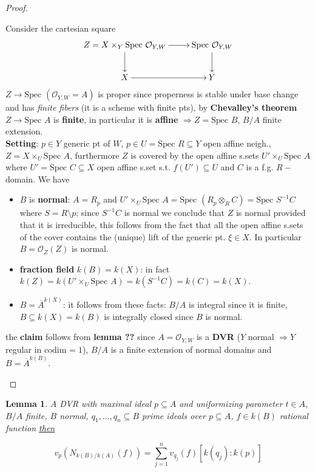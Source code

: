 \documentclass[oneside,a4paper,11pt]{amsbook}
\theoremstyle{pl}
\newtheorem*{lem*}{Lemma}
\theoremstyle{df}
\theoremstyle{rm}
\newcommand{\pa}[1]{
\left(#1\right)
}
\newcommand{\ol}[1]{
\overline{#1}
}
\newcommand{\ul}[1]{
\underline{#1}
}
\newcommand{\mc}[1]{
\mathcal{#1}
}
\newcommand{\spc}[1]{
\text{Spec }#1
}
\newcommand{\cod}[2]{
\text{codim}_{#1}{#2}
}
\begin{document}
\begin{proof}
\begin{itemize}
{\[\]
Consider the cartesian square
\[
\xymatrix{
Z=X\times_Y\spc \mc{O}_{Y,W}\ar[r]\ar[d] &\spc \mc{O}_{Y,W}\ar[d]\\
X\ar[r] &Y\\
}
\]
$Z\rightarrow\spc\pa{\mc{O}_{Y,W}=A}$ is proper since properness is stable under base change and has \emph{finite fibers} (it is a scheme with finite pts), by \textbf{Chevalley's theorem} $Z\rightarrow\spc A$ is \textbf{finite}, in particular it is \textbf{affine} $\Rightarrow Z=\spc B$, $B/A$ finite extension.\\
\textbf{Setting}: $p\in Y$ generic pt of $W$, $p\in U=\spc R\subseteq Y$ open affine neigh., $Z=X\times_U\spc A$, furthermore $Z$ is covered by the open affine s.sets $U'\times_U\spc A$ where $U'=\spc C\subseteq X$ open affine s.set s.t. $f(U')\subseteq U$ and $C$ is a f.g. $R-$domain. We have
\begin{itemize}
\item{$B$ is \textbf{normal}: $A=R_p$ and $U'\times_U\spc A=\spc\pa{R_p\otimes_RC}=\spc S^{-1}C$ where $S=R\setminus p$; since $S^{-1}C$ is normal we conclude that $Z$ is normal provided that it is irreducible, this follows from the fact that all the open affine s.sets of the cover contains the (unique) lift of the generic pt. $\xi\in X$. In particular $B=\mc{O}_Z(Z)$ is normal.}
\item{\textbf{fraction field} $k(B)=k(X)$: in fact $k(Z)=k(U'\times_U\spc A)=k(S^{-1}C)=k(C)=k(X)$.}
\item{$B=\ol{A}^{k(X)}$: it follows from these facts: $B/A$ is integral since it is finite, $B\subseteq k(X)=k(B)$ is integrally closed since $B$ is normal.}
\end{itemize}
the \textbf{claim} follows from \textbf{lemma ??} since $A=\mc{O}_{Y,W}$ is a \textbf{DVR} ($Y$ normal $\Rightarrow Y$ regular in $\cod{}{}=1$), $B/A$ is a finite extension of normal domains and $B=\ol{A}^{k(B)}$.}
\end{itemize}
\end{proof}

\begin{lem*}
$A$ DVR with maximal ideal $p\subseteq A$ and uniformizing parameter $t\in A$, $B/A$ finite, $B$ normal, $q_1,\dots,q_n\subseteq B$ prime ideals over $p\subseteq A$, $f\in k(B)$ rational function \ul{then} 
\[
v_p\pa{N_{k(B)/k(A)}(f)}=\sum_{j=1}^n{v_{q_j}(f)[k(q_j):k(p)]}
\] 
\end{lem*}
\end{document}
